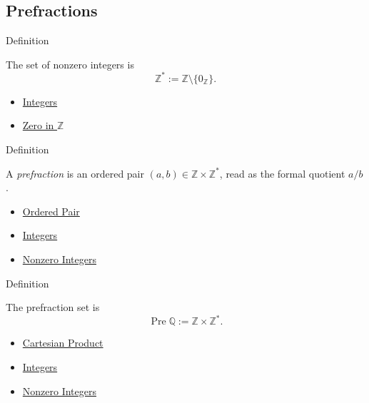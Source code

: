\subsection*{Prefractions}

\begin{definitionbox}{Definition}
\begin{definition}
\label{def:nonzero-integers}
The set of nonzero integers is
\[
\mathbb{Z}^{\ast}:=\mathbb{Z}\setminus\{0_{\mathbb{Z}}\}.
\]
\end{definition}
\end{definitionbox}

\begin{dependencies}
\begin{itemize}
  \item \hyperref[def:integers]{Integers}
  \item \hyperref[def:zero-in-z]{Zero in $\mathbb{Z}$}
\end{itemize}
\end{dependencies}

\begin{definitionbox}{Definition}
\begin{definition}[Prefraction]
\label{def:prefraction}
A \emph{prefraction} is an ordered pair $(a,b)\in\mathbb{Z}\times\mathbb{Z}^{\ast}$,
read as the formal quotient $a/b$.
\end{definition}
\end{definitionbox}

\begin{dependencies}
\begin{itemize}
  \item \hyperref[def:ordered-pair]{Ordered Pair}
  \item \hyperref[def:integers]{Integers}
  \item \hyperref[def:nonzero-integers]{Nonzero Integers}
\end{itemize}
\end{dependencies}

\begin{definitionbox}{Definition}
\begin{definition}
\label{def:prefraction-set}
The prefraction set is
\[
\operatorname{Pre}\mathbb{Q}:=\mathbb{Z}\times\mathbb{Z}^{\ast}.
\]
\end{definition}
\end{definitionbox}

\begin{dependencies}
\begin{itemize}
  \item \hyperref[def:cartesian-product-rel]{Cartesian Product}
  \item \hyperref[def:integers]{Integers}
  \item \hyperref[def:nonzero-integers]{Nonzero Integers}
\end{itemize}
\end{dependencies}

